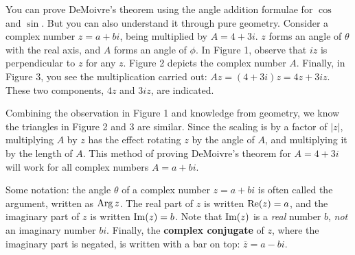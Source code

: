 \documentclass[../textbook.tex]{subfiles}
\begin{document}
You can prove DeMoivre’s theorem using the angle addition formulae for $\cos$ and $\sin$. But you can also understand it through pure geometry. Consider a complex number $z = a + bi$, being multiplied by $A = 4 + 3i$. $z$ forms an angle of $\theta$ with the real axis, and $A$ forms an angle of $\phi$. In Figure 1, observe that $iz$ is perpendicular to $z$ for any $z$. Figure 2 depicts the complex number $A$. Finally, in Figure 3, you see the multiplication carried out: $Az = (4+3i)z = 4z + 3iz$. These two components, $4z$ and $3iz$, are indicated.

Combining the observation in Figure 1 and knowledge from geometry, we know the triangles in Figure 2 and 3 are similar. Since the scaling is by a factor of $|z|$, multiplying $A$ by $z$ has the effect rotating $z$ by the angle of $A$, and multiplying it by the length of $A$. This method of proving DeMoivre's theorem for $A=4+3i$ will work for all complex numbers $A=a+bi$.

Some notation: the angle $\theta$ of a complex number $z = a+bi$ is often called the argument, written as $\operatorname{Arg} z$. The real part of $z$ is written $\operatorname{Re} (z) = a$, and the imaginary part of $z$ is written $\operatorname{Im} (z) = b$. Note that $\operatorname{Im} (z)$ is a \textit{real} number $b$, \textit{not} an imaginary number $bi$. Finally, the \textbf{complex conjugate} of $z$, where the imaginary part is negated, is written with a bar on top: $\overline{z} = a-bi$.
\end{document}
